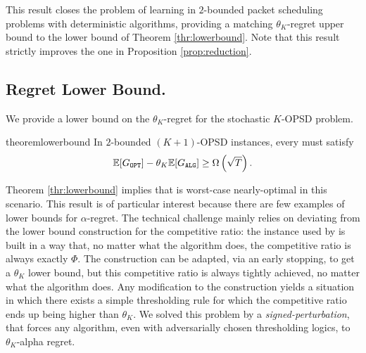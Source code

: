 This result closes the problem of learning in $2$-bounded packet scheduling problems with deterministic algorithms, providing a matching $\theta_K$-regret upper bound to the lower bound of Theorem \ref{thr:lowerbound}. Note that this result strictly improves the one in Proposition \ref{prop:reduction}.

\subsection{Regret Lower Bound.} We provide a lower bound on the $\theta_K$-regret for the stochastic $K$-OPSD problem.
\begin{restatable}{theorem}{lowerbound}
\label{thr:lowerbound}
In $2$-bounded $(K+1)$-OPSD instances, every \alg must satisfy
    $$
     \mathbb{E}[\Gopt]- \theta_K \mathbb{E}[G_{\text{\texttt{ALG}}}] \ge \Omega\left(\sqrt{T}\right).
    $$
\end{restatable}

Theorem \ref{thr:lowerbound} implies that \algtheta is worst-case nearly-optimal in this scenario. This result is of particular interest because there are few examples of lower bounds for $\alpha$-regret. The technical challenge mainly relies on deviating from the lower bound construction for the competitive ratio: the instance used by \cite{hajek2001competitiveness} is built in a way that, no matter what the algorithm does, the competitive ratio is always exactly $\Phi$. The construction can be adapted, via an early stopping, to get a $\theta_K$ lower bound, but this competitive ratio is always tightly achieved, no matter what the algorithm does. Any modification to the construction yields a situation in which there exists a simple thresholding rule for which the competitive ratio ends up being higher than $\theta_K$. We solved this problem by a \textit{signed-perturbation}, that forces any algorithm, even with adversarially chosen thresholding logics, to $\theta_K$-alpha regret.